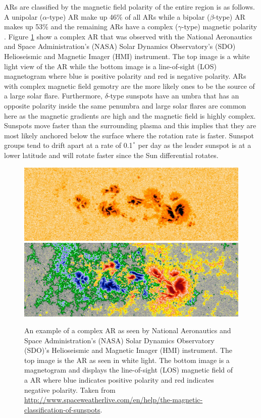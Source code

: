 	ARs are classified by the magnetic field polarity of the entire region is as follows.
	A unipolar ($\alpha$-type) AR make up 46\% of all ARs while a bipolar ($\beta$-type) AR makes up 53\% and the remaining ARs have a complex ($\gamma$-type) magnetic polarity \citep{2014masu.book.....P}.
	Figure \ref{fig:AR_Mag} show a complex AR that was observed with the National Aeronautics and Space Administration's (NASA) Solar Dynamics Observatory's (SDO) Helioseismic and Magnetic Imager (HMI) instrument.
	The top image is a white light view of the AR while the bottom image is a line-of-sight (LOS) magnetogram where blue is positive polarity and red is negative polarity.
	ARs with complex magnetic field gemotry are the more likely ones to be the source of a large solar flare.
	Furthermore, $\delta$-type sunspots have an umbra that has an opposite polarity inside the same penumbra and large solar flares are common here as the magnetic gradients are high and the magnetic field is highly complex.
	Sunspots move faster than the surrounding plasma and this implies that they are most likely anchored below the surface where the rotation rate is faster.
	Sunspot groups tend to drift apart at a rate of 0.1$^\degree$ per day as the leader sunspot is at a lower latitude and will rotate faster since the Sun differential rotates.
	
	\begin{figure}
		\centering
		\includegraphics[width=\textwidth]{sunspot.jpg}\\
		\includegraphics[width=\textwidth]{sunspot_magnetic.jpg}\\
		\caption{
			     An example of a complex AR as seen by National Aeronautics and Space Administration's (NASA) Solar Dynamics Observatory (SDO)'s Helioseismic and Magnetic Imager (HMI) instrument.
			     The top image is the AR as seen in white light.
			     The bottom image is a magnetogram and displays the line-of-sight (LOS) magnetic field of a AR where blue indicates positive polarity and red indicates negative polarity.
			     Taken from \url{http://www.spaceweatherlive.com/en/help/the-magnetic-classification-of-sunspots}.	
		        }
		\label{fig:AR_Mag}
	\end{figure}

